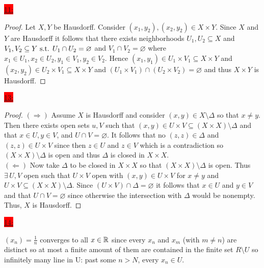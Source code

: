 \documentclass{exam}
\begin{document}
\colorbox{red}{\underline{11:}}
\begin{solution}
    \begin{proof}
        Let $X, Y$ be Hausdorff. Consider $(x_1, y_2), (x_2, y_2) \in X \times Y$. Since $X$ and $Y$ are Hausdorff it follows that there exists neighborhoods $U_1, U_2 \subseteq X$ and $V_1, V_2 \subseteq Y \text{ s.t. } U_1 \cap U_2 = \varnothing$ and $V_1 \cap V_2 = \varnothing$ where $x_1 \in U_1, x_2 \in U_2, y_1 \in V_1, y_2 \in V_2$. Hence $(x_1, y_1) \in U_1 \times V_1 \subseteq X \times Y$ and $(x_2, y_2) \in U_2 \times V_1 \subseteq X \times Y$ and $(U_1 \times V_1) \cap (U_2 \times V_2) = \varnothing$ and thus $X \times Y$ is Hausdorff.
    \end{proof}
\end{solution}

\colorbox{red}{\underline{13:}}
\begin{solution}
    \begin{proof}
        $(\Rightarrow)$ Assume $X$ is Hausdorff and consider $(x, y) \in X \setminus \Delta$ so that $x \neq y$. Then there exists open sets $u, V$ such that $(x, y) \in U \times V \subseteq (X \times X) \setminus \Delta$ and that $x \in U, y \in V$, and $U \cap V = \varnothing$. It follows that no $(z, z) \in \Delta$ and $(z, z) \in U \times V$ since then $z \in U$ and $z \in V$ which is a contradiction so $(X \times X) \setminus \Delta$ is open and thus $\Delta$ is closed in $X \times X$. \\
        $(\Leftarrow)$ Now take $\Delta$ to be closed in $X \times X$ so that $(X \times X) \setminus \Delta$ is open. Thus $\exists\, U, V$ open such that $U \times V$ open with $(x, y) \in U \times V$ for $x \neq y$ and $U \times V \subseteq (X \times X) \setminus \Delta$. Since $(U \times V) \cap \Delta = \varnothing$ it follows that $x \in U$ and $y \in V$ and that $U \cap V = \varnothing$ since otherwise the intersection with $\Delta$ would be nonempty. Thus, $X$ is Hausdorff.
    \end{proof}
\end{solution}

\colorbox{red}{\underline{14:}}
\begin{solution}
    $(x_n) = \frac{1}{n}$ converges to all $x \in \mathbb R$ since every $x_n$ and $x_m$ (with $m \neq n$) are distinct so at most a finite amount of them are contained in the finite set $R \setminus U$ so infinitely many line in U: past some $n > N$, every $x_n \in U$.
\end{solution}
\end{document}
